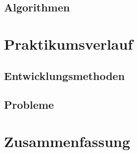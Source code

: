 \documentclass[a4paper, 12pt]{scrartcl}
\begin{document}
\subsection{Algorithmen}

\section{Praktikumsverlauf}
\subsection{Entwicklungsmethoden}

\subsection{Probleme}

\section{Zusammenfassung}
\end{document}
